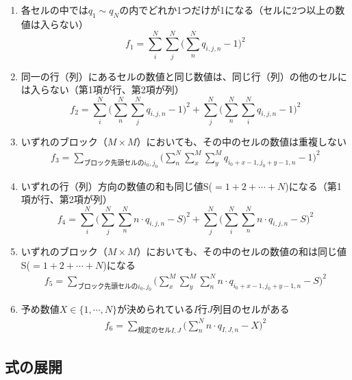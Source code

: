 \documentclass[uplatex,dvipdfmx,a4paper,11pt,oneside,openany]{jsbook}
\begin{document}
\begin{enumerate}
\item 各セルの中では$q_1\sim q_N$の内でどれか1つだけが1になる（セルに2つ以上の数値は入らない）
\begin{equation*}
  f_1 = \sum_i^N\sum_j^N\bigg(\sum_n^N q_{i,j,n} - 1\bigg)^2
\end{equation*}
\item 同一の行（列）にあるセルの数値と同じ数値は、同じ行（列）の他のセルには入らない（第1項が行、第2項が列）
\begin{equation*}
  f_2 = \sum_i^N\bigg(\sum_n^N\sum_j^N q_{i,j,n} - 1\bigg)^2 + \sum_j^N\bigg(\sum_n^N\sum_i^N q_{i,j,n} - 1\bigg)^2
\end{equation*}
\item いずれのブロック（$M\times M$）においても、その中のセルの数値は重複しない
\begin{eqnarray*}
  f_3 = \sum_{ブロック先頭セルのi_0,j_0}\bigg(\sum_n^N\sum_x^M\sum_y^M q_{i_0+x-1,j_0+y-1,n} - 1\bigg)^2
\end{eqnarray*}
\item いずれの行（列）方向の数値の和も同じ値S($=1+2+\cdots +N$)になる（第1項が行、第2項が列）
\begin{equation*}
  f_4 = \sum_i^N\bigg(\sum_j^N\sum_n^N n \cdot q_{i,j,n} - S\bigg)^2 + \sum_j^N\bigg(\sum_i^N\sum_n^N n \cdot q_{i,j,n} - S\bigg)^2
\end{equation*}
\item いずれのブロック（$M\times M$）においても、その中のセルの数値の和は同じ値S($=1+2+\cdots +N$)になる
\begin{eqnarray*}
  f_5 = \sum_{ブロック先頭セルのi_0,j_0}\bigg(\sum_x^M\sum_y^M\sum_n^N n \cdot q_{i_0+x-1,j_0+y-1,n} - S\bigg)^2
\end{eqnarray*}
\item 予め数値$X\in\{1,\cdots,N\}$が決められている$I$行$J$列目のセルがある
\begin{eqnarray*}
  f_6 = \sum_{規定のセルI,J}\bigg(\sum_n^N n \cdot q_{I,J,n} - X\bigg)^2
\end{eqnarray*}
\end{enumerate}

\subsection{式の展開}
\end{document}
